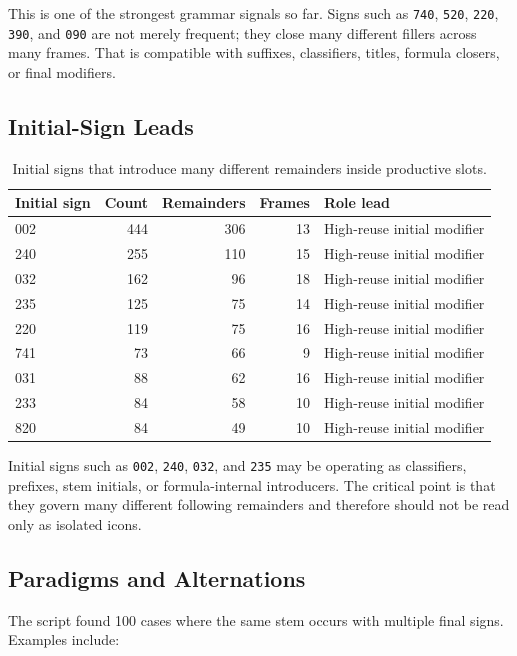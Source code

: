 This is one of the strongest grammar signals so far. Signs such as \texttt{740}, \texttt{520}, \texttt{220}, \texttt{390}, and \texttt{090} are not merely frequent; they close many different fillers across many frames. That is compatible with suffixes, classifiers, titles, formula closers, or final modifiers.

\subsection{Initial-Sign Leads}

\begin{table}[htbp]
\centering
\begin{tabular}{lrrrl}
\toprule
\textbf{Initial sign} & \textbf{Count} & \textbf{Remainders} & \textbf{Frames} & \textbf{Role lead} \\
\midrule
002 & 444 & 306 & 13 & High-reuse initial modifier \\
240 & 255 & 110 & 15 & High-reuse initial modifier \\
032 & 162 & 96 & 18 & High-reuse initial modifier \\
235 & 125 & 75 & 14 & High-reuse initial modifier \\
220 & 119 & 75 & 16 & High-reuse initial modifier \\
741 & 73 & 66 & 9 & High-reuse initial modifier \\
031 & 88 & 62 & 16 & High-reuse initial modifier \\
233 & 84 & 58 & 10 & High-reuse initial modifier \\
820 & 84 & 49 & 10 & High-reuse initial modifier \\
\bottomrule
\end{tabular}
\caption{Initial signs that introduce many different remainders inside productive slots.}
\label{tab:slot-initial-sign-leads}
\end{table}

Initial signs such as \texttt{002}, \texttt{240}, \texttt{032}, and \texttt{235} may be operating as classifiers, prefixes, stem initials, or formula-internal introducers. The critical point is that they govern many different following remainders and therefore should not be read only as isolated icons.

\subsection{Paradigms and Alternations}

The script found 100 cases where the same stem occurs with multiple final signs. Examples include:

